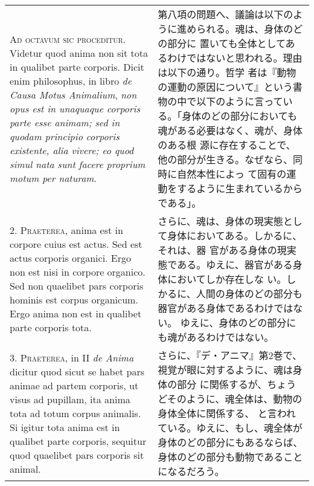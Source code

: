 \documentclass[paper=a4paper,fontsize=10pt,jafontsize=9pt,titlepage]{jlreq}
\begin{document}
\begin{longtable}{p{21em}p{21em}}
 {\scshape Ad octavum sic proceditur}. Videtur quod anima non sit tota
 in qualibet parte corporis. Dicit enim philosophus, in libro
 {\itshape de Causa Motus Animalium}, {\itshape non opus est in
 unaquaque corporis parte esse animam; sed in quodam principio
 corporis existente, alia vivere; eo quod simul nata sunt facere
 proprium motum per naturam}.

 &

 第八項の問題へ、議論は以下のように進められる。魂は、身体のどの部分に
 置いても全体としてあるわけではないと思われる。理由は以下の通り。哲学
 者は『動物の運動の原因について』という書物の中で以下のように言ってい
 る。「身体のどの部分においても魂がある必要はなく、魂が、身体のある根
 源に存在することで、他の部分が生きる。なぜなら、同時に自然本性によっ
 て固有の運動をするように生まれているからである」。
 
\\



2. {\scshape Praeterea}, anima est in corpore cuius est actus. Sed est
actus corporis organici. Ergo non est nisi in corpore organico. Sed
non quaelibet pars corporis hominis est corpus organicum. Ergo anima
non est in qualibet parte corporis tota.

 &

さらに、魂は、身体の現実態として身体においてある。しかるに、それは、器
官がある身体の現実態である。ゆえに、器官がある身体においてしか存在しな
い。しかるに、人間の身体のどの部分も器官がある身体であるわけではない。
ゆえに、身体のどの部分にも魂があるわけではない。
 
\\



3. {\scshape Praeterea}, in II {\itshape de Anima} dicitur quod sicut
se habet pars animae ad partem corporis, ut visus ad pupillam, ita
anima tota ad totum corpus animalis. Si igitur tota anima est in
qualibet parte corporis, sequitur quod quaelibet pars corporis sit
animal.

 &

 さらに、『デ・アニマ』第2巻で、視覚が眼に対するように、魂は身体の部分
 に関係するが、ちょうどそのように、魂全体は、動物の身体全体に関係する、
 と言われている。ゆえに、もし、魂全体が身体のどの部分にもあるならば、
 身体のどの部分も動物であることになるだろう。

\\




\end{longtable}
\end{document}
